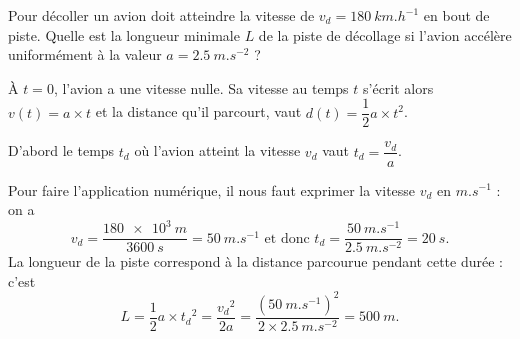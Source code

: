 \debutEntrainement


\begin{enonce}
Pour décoller un avion doit atteindre la vitesse de $v_d= \SI{180}{km.h^{-1}}$ en bout de piste.\newline
Quelle est la longueur minimale $L$ de la piste de décollage si l'avion 
accélère  uniformément à la valeur $a=\SI{2,5}{m.s^{-2}}$ ?
\begin{listeQCM4Colonnes}
	\item {} 
	\item {} 
	\item {}  
	\item {}  
\end{listeQCM4Colonnes}
\medskip
\end{enonce}

\reponse{\reponseC{}}

\begin{corrige}
À $t=0$, l'avion a une vitesse nulle. Sa vitesse au temps $t$ s'écrit alors  
$v(t) = a \times t $ et la distance qu'il parcourt, vaut $d(t) = \dfrac{1}{2}a\times t^2$.

D'abord le temps $t_d$ où l'avion atteint la vitesse $v_d$ vaut $t_d = \dfrac{v_d}{a}$.

Pour faire l'application numérique, il nous faut  exprimer la vitesse $v_d$ en $\si{m.s^{-1}}$ : on a 
\[
v_d=\frac{\SI{180e3}{m}}{\SI{3600}{s}}=\SI{50}{m.s^{-1}}
\text{ et donc }
t_d=\frac{\SI{50}{m.s^{-1}}}{\SI{2,5}{m.s^{-2}}} = \SI{20}{s}.
\]
La longueur de la piste correspond à la distance parcourue pendant cette durée : c'est
\[
L =\dfrac{1}{2}a\times {t_d}^2 = \dfrac{{v_d}^2}{2a} = \dfrac{(\SI{50}{m.s^{-1}})^2}{2 \times \SI{2,5}{m.s^{-2}}} =\SI{500}{m}.
\]
\end{corrige}


\finEntrainement





